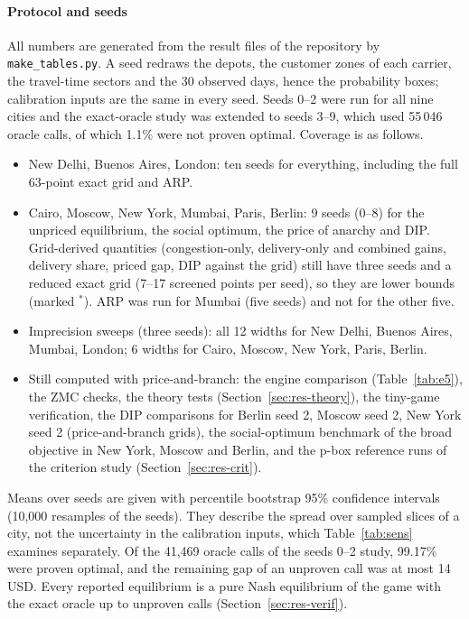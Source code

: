 \documentclass[preprint,11pt]{elsarticle}
\theoremstyle{definition}
\theoremstyle{remark}
\begin{document}
\paragraph{Protocol and seeds} All numbers are generated from the result files of the repository by \texttt{make\_tables.py}. A seed redraws the depots, the customer zones of each carrier, the travel-time sectors and the 30 observed days, hence the probability boxes; calibration inputs are the same in every seed. Seeds 0--2 were run for all nine cities and the exact-oracle study was extended to seeds 3--9, which used 55\,046 oracle calls, of which 1.1\% were not proven optimal. Coverage is as follows.
\begin{itemize}[leftmargin=*,itemsep=0pt]
\item New Delhi, Buenos Aires, London: ten seeds for everything, including the full 63-point exact grid and ARP.
\item Cairo, Moscow, New York, Mumbai, Paris, Berlin: 9 seeds (0--8) for the unpriced equilibrium, the social optimum, the price of anarchy and DIP. Grid-derived quantities (congestion-only, delivery-only and combined gains, delivery share, priced gap, DIP against the grid) still have three seeds and a reduced exact grid (7--17 screened points per seed), so they are lower bounds (marked $^*$). ARP was run for Mumbai (five seeds) and not for the other five.
\item Imprecision sweeps (three seeds): all 12 widths for New Delhi, Buenos Aires, Mumbai, London; 6 widths for Cairo, Moscow, New York, Paris, Berlin.
\item Still computed with price-and-branch: the engine comparison (Table~\ref{tab:e5}), the ZMC checks, the theory tests (Section~\ref{sec:res-theory}), the tiny-game verification, the DIP comparisons for Berlin seed 2, Moscow seed 2, New York seed 2 (price-and-branch grids), the social-optimum benchmark of the broad objective in New York, Moscow and Berlin, and the p-box reference runs of the criterion study (Section~\ref{sec:res-crit}).
\end{itemize}
Means over seeds are given with percentile bootstrap 95\% confidence intervals (10{,}000 resamples of the seeds). They describe the spread over sampled slices of a city, not the uncertainty in the calibration inputs, which Table~\ref{tab:sens} examines separately. Of the 41{,}469 oracle calls of the seeds 0--2 study, 99.17\% were proven optimal, and the remaining gap of an unproven call was at most 14 USD. Every reported equilibrium is a pure Nash equilibrium of the game with the exact oracle up to unproven calls (Section~\ref{sec:res-verif}).
\end{document}
